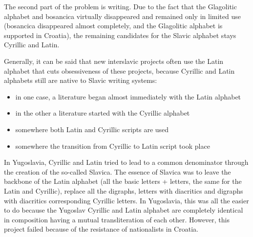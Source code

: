 The second part of the problem is writing. Due to the fact that the Glagolitic alphabet and bosancica virtually disappeared and remained only in limited use (bosancica disappeared almost completely, and the Glagolitic alphabet is supported in Croatia), the remaining candidates for the Slavic alphabet stays Cyrillic and Latin.

Generally, it can be said that new interslavic projects often use the Latin alphabet that cuts obsessiveness of these projects, because Cyrillic and Latin alphabets still are native to Slavic writing systems:

\begin{itemize}
	\item in one case, a literature began almost immediately with the Latin alphabet
	\item in the other a literature started with the Cyrillic alphabet
	\item somewhere both Latin and Cyrillic scripts are used
	\item somewhere the transition from Cyrillic to Latin script took place
\end{itemize}

In Yugoslavia, Cyrillic and Latin tried to lead to a common denominator through the creation of the so-called Slavica. The essence of Slavica was to leave the backbone of the Latin alphabet (all the basic letters + letters, the same for the Latin and Cyrillic), replace all the digraphs, letters with diacritics and digraphs with diacritics corresponding Cyrillic letters. In Yugoslavia, this was all the easier to do because the Yugoslav Cyrillic and Latin alphabet are completely identical in composition having a mutual transliteration of each other. However, this project failed because of the resistance of nationalists in Croatia.